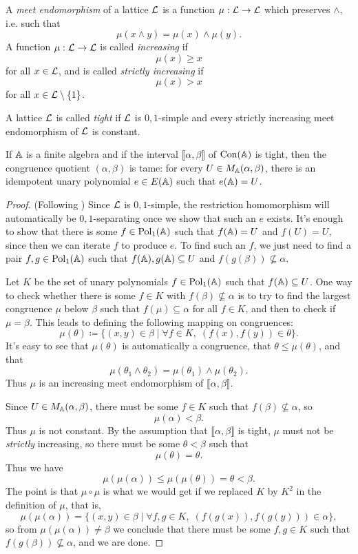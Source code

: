 \begin{appendices}
\begin{defn}
A \emph{meet endomorphism} of a lattice $\mathcal{L}$ is a function $\mu : \mathcal{L} \rightarrow \mathcal{L}$ which preserves $\wedge$, i.e. such that
\[
\mu(x \wedge y) = \mu(x) \wedge \mu(y).
\]
A function $\mu : \mathcal{L} \rightarrow \mathcal{L}$ is called \emph{increasing} if
\[
\mu(x) \ge x
\]
for all $x \in \mathcal{L}$, and is called \emph{strictly increasing} if
\[
\mu(x) > x
\]
for all $x \in \mathcal{L} \setminus \{1\}$.

A lattice $\mathcal{L}$ is called \emph{tight} if $\mathcal{L}$ is $0,1$-simple and every strictly increasing meet endomorphism of $\mathcal{L}$ is constant.
\end{defn}

\begin{thm}\label{thm-tight-tame} If $\mathbb{A}$ is a finite algebra and if the interval $\llbracket \alpha, \beta \rrbracket$ of $\operatorname{Con}(\mathbb{A})$ is tight, then the congruence quotient $(\alpha, \beta)$ is tame: for every $U \in M_{\mathbb{A}}(\alpha, \beta)$, there is an idempotent unary polynomial $e \in E(\mathbb{A})$ such that $e(\mathbb{A}) = U$.
\end{thm}
\begin{proof} (Following \cite{hobby-mckenzie}) Since $\mathcal{L}$ is $0,1$-simple, the restriction homomorphism will automatically be $0,1$-separating once we show that such an $e$ exists. It's enough to show that there is some $f \in \operatorname{Pol}_1(\mathbb{A})$ such that $f(\mathbb{A}) = U$ and $f(U) = U$, since then we can iterate $f$ to produce $e$. To find such an $f$, we just need to find a pair $f,g \in \operatorname{Pol}_1(\mathbb{A})$ such that $f(\mathbb{A}), g(\mathbb{A}) \subseteq U$ and $f(g(\beta)) \not\subseteq \alpha$.

Let $K$ be the set of unary polynomials $f \in \operatorname{Pol}_1(\mathbb{A})$ such that $f(\mathbb{A}) \subseteq U$. One way to check whether there is some $f \in K$ with $f(\beta) \not\subseteq \alpha$ is to try to find the largest congruence $\mu$ below $\beta$ such that $f(\mu) \subseteq \alpha$ for all $f \in K$, and then to check if $\mu = \beta$. This leads to defining the following mapping on congruences:
\[
\mu(\theta) \coloneqq \{(x,y) \in \beta \mid \forall f \in K,\; (f(x), f(y)) \in \theta\}.
\]
It's easy to see that $\mu(\theta)$ is automatically a congruence, that $\theta \le \mu(\theta)$, and that
\[
\mu(\theta_1 \wedge \theta_2) = \mu(\theta_1) \wedge \mu(\theta_2).
\]
Thus $\mu$ is an increasing meet endomorphism of $\llbracket\alpha, \beta\rrbracket$.

Since $U \in M_{\mathbb{A}}(\alpha,\beta)$, there must be some $f \in K$ such that $f(\beta) \not\subseteq \alpha$, so
\[
\mu(\alpha) < \beta.
\]
Thus $\mu$ is not constant. By the assumption that $\llbracket \alpha, \beta \rrbracket$ is tight, $\mu$ must not be \emph{strictly} increasing, so there must be some $\theta < \beta$ such that
\[
\mu(\theta) = \theta.
\]
Thus we have
\[
\mu(\mu(\alpha)) \le \mu(\mu(\theta)) = \theta < \beta.
\]
The point is that $\mu\circ \mu$ is what we would get if we replaced $K$ by $K^2$ in the definition of $\mu$, that is,
\[
\mu(\mu(\alpha)) = \{(x,y) \in \beta \mid \forall f, g \in K,\; (f(g(x)), f(g(y))) \in \alpha\},
\]
so from $\mu(\mu(\alpha)) \ne \beta$ we conclude that there must be some $f,g \in K$ such that $f(g(\beta)) \not\subseteq \alpha$, and we are done.
\end{proof}


\end{appendices}

